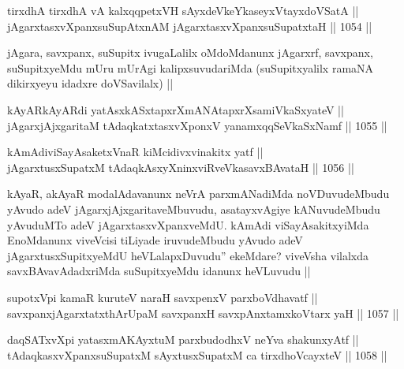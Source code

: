 \begin{shl}
tirxdhA tirxdhA vA kalxqqpetxVH sAyxdeVkeYkaseyxVtayxdoVSatA || \\
jAgarxtasxvXpanxsuSupAtxnAM jAgarxtasxvXpanxsuSupatxtaH ||  1054 ||  
\end{shl}

\begin{artha}
jAgara, savxpanx, suSupitx ivugaLalilx oMdoMdanunx jAgarxrf, savxpanx, suSupitxyeMdu mUru mUrAgi kalipxsuvudariMda (suSupitxyalilx ramaNA dikirxyeyu idadxre doVSavilalx) ||
\end{artha}


\begin{shl}
kAyARkAyARdi yatAsxkASxtapxrXmANAtapxrXsamiVkaSxyateV || \\
jAgarxjAjxgaritaM tAdaqkatxtasxvXponxV yanamxqqSeVkaSxNamf ||  1055 ||  
\end{shl}
				
\begin{shl}
kAmAdiviSayAsaketxVnaR kiMcidivxvinakitx yatf ||  \\
jAgarxtusxSupatxM tAdaqkAsxyXninxviRveVkasavxBAvataH ||  1056 ||  
\end{shl}

\begin{artha}
kAyaR, akAyaR modalAdavanunx neVrA parxmANadiMda noVDuvudeMbudu yAvudo adeV jAgarxjAjxgaritaveMbuvudu, asatayxvAgiye kANuvudeMbudu yAvuduMTo adeV jAgarxtasxvXpanxveMdU. kAmAdi viSayAsakitxyiMda EnoMdanunx viveVcisi tiLiyade iruvudeMbudu yAvudo adeV jAgarxtusxSupitxyeMdU heVLalapxDuvudu'' ekeMdare? viveVsha vilalxda savxBAvavAdadxriMda suSupitxyeMdu idanunx heVLuvudu ||
\end{artha}


\begin{shl}
supotxV\s pi kamaR kuruteV naraH savxpenxV parxboVdhavatf || \\
savxpanxjAgarxtatxthArUpaM savxpanxH savxpAnxtamxkoV\s tarx yaH ||  1057 ||  
\end{shl}
				
\begin{shl}
daqSATxvX\s pi yatasxmAKAyxtuM parxbudodhxV neYva shakunxyAtf || \\
tAdaqkasxvXpanxsuSupatxM sAyxtusxSupatxM ca tirxdhoVcayxteV ||  1058 ||  
\end{shl}
				
